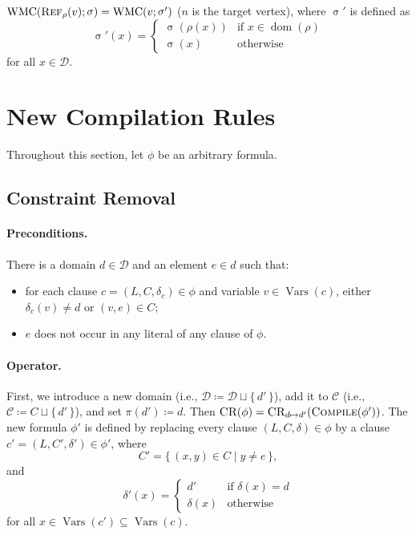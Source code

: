 \documentclass{article}
\theoremstyle{definition}
\theoremstyle{remark}
\DeclareMathOperator{\Compile}{\textsc{Compile}}
\DeclareMathOperator{\CR}{\textsc{CR}}
\DeclareMathOperator{\Reff}{\textsc{Ref}}
\DeclareMathOperator{\dom}{dom}
\DeclareMathOperator{\size}{\sigma}
\DeclareMathOperator{\Vars}{Vars}
\DeclareMathOperator{\WMC}{WMC}
\begin{document}
$\WMC(\Reff_\rho(v); \size) = \WMC(v; \size')$ ($n$ is the target vertex), where $\size'$ is defined as
\[
\size'(x) =
\begin{cases}
  \size(\rho(x)) & \text{if } x \in \dom(\rho) \\
  \size(x) & \text{otherwise}
\end{cases}
\]
for all $x \in \mathcal{D}$.

\section{New Compilation Rules}

Throughout this section, let $\phi$ be an arbitrary formula.

\subsection{Constraint Removal}

\paragraph{Preconditions.} There is a domain $d \in \mathcal{D}$ and an element $e \in d$ such that:
\begin{itemize}
\item for each clause $c = (L, C, \delta_c) \in \phi$ and variable $v \in \Vars(c)$, either $\delta_c(v) \ne d$ or $(v, e) \in C$;
\item $e$ does not occur in any literal of any clause of $\phi$.
\end{itemize}

\paragraph{Operator.} First, we introduce a new domain (i.e., $\mathcal{D} \coloneqq \mathcal{D} \sqcup \{\, d' \,\}$), add it to $\mathcal{C}$ (i.e., $\mathcal{C} \coloneqq C \sqcup \{\, d' \,\}$), and set $\pi(d') \coloneqq d$. Then $\CR(\phi) = \CR_{d \mapsto d'}(\Compile(\phi'))$. The new formula $\phi'$ is defined by replacing every clause $(L, C, \delta) \in \phi$ by a clause $c' = (L, C', \delta') \in \phi'$, where
\[
C' = \{\, (x, y) \in C \mid y \ne e \,\},
\]
and
\[
\delta'(x) =
\begin{cases}
  d' & \text{if } \delta(x) = d \\
  \delta(x) & \text{otherwise}
\end{cases}
\]
for all $x \in \Vars(c') \subseteq \Vars(c)$.
\end{document}

